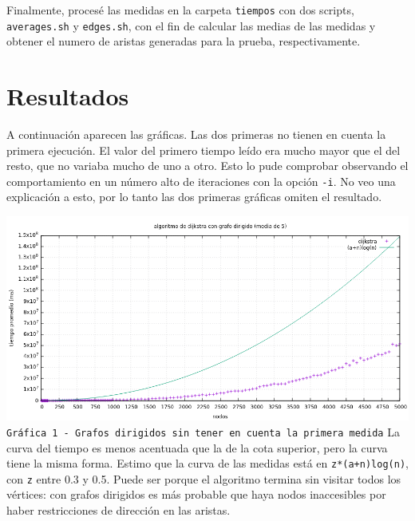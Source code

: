 \documentclass[12pt , a4paper]{article}
\begin{document}
	Finalmente, procesé las medidas en la carpeta \texttt{tiempos} con dos scripts, \texttt{averages.sh} y \texttt{edges.sh}, con el fin de calcular las medias de las medidas y obtener el numero de aristas generadas para la prueba, respectivamente.


\section{Resultados}

	A continuación aparecen las gráficas. Las dos primeras no tienen en cuenta la primera ejecución. El valor del primero tiempo leído era mucho mayor que el del resto, que no variaba mucho de uno a otro. Esto lo pude comprobar observando el comportamiento en un número alto de iteraciones con la opción \texttt{-i}. No veo una explicación a esto, por lo tanto las dos primeras gráficas omiten el resultado.
	
	\hspace*{-.15\linewidth}
	\includegraphics[width=1.25\hsize]{dir5.png}
	\texttt{Gráfica 1 - Grafos dirigidos sin tener en cuenta la primera medida}
	La curva del tiempo es menos acentuada que la de la cota superior, pero la curva tiene la misma forma. Estimo que la curva de las medidas está en \texttt{z*(a+n)log(n)}, con \texttt{z} entre 0.3 y 0.5. Puede ser porque el algoritmo termina sin visitar todos los vértices: con grafos dirigidos es más probable que haya nodos inaccesibles por haber restricciones de dirección en las aristas. 
	
\end{document}
